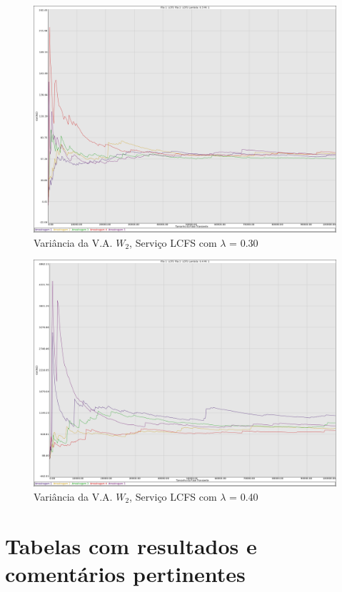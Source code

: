 \documentclass[a4paper,10pt]{article}
\begin{document}
\begin{figure}
	\caption{Variância da V.A. $W_2$, Serviço LCFS com $\lambda$ = 0.30}
	\label{figTransienteLCFSfila2VarWLambda030}
	\includegraphics[scale = 0.20]{./graficos_transiente_2/07.png}
\end{figure}

\begin{figure}
	\caption{Variância da V.A. $W_2$, Serviço LCFS com $\lambda$ = 0.40}
	\label{figTransienteLCFSfila2VarWLambda040}
	\includegraphics[scale = 0.20]{./graficos_transiente_2/08.png}
\end{figure}

\clearpage
\pagebreak

\section{Tabelas com resultados e comentários pertinentes}
\end{document}
